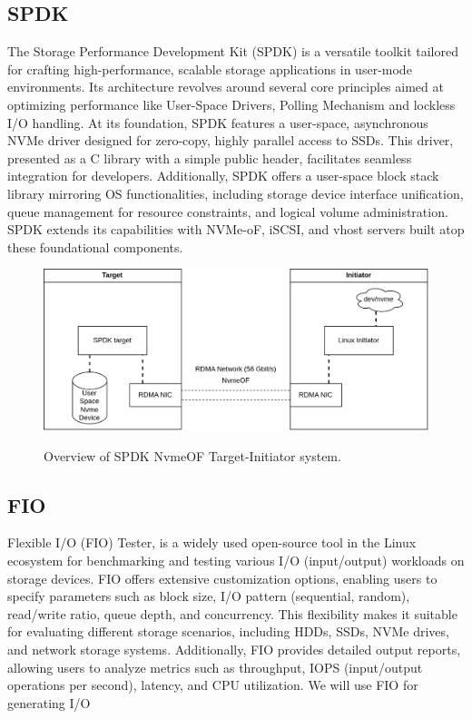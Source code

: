 \subsection{SPDK}
The Storage Performance Development Kit (SPDK) is a versatile toolkit tailored
for crafting high-performance, scalable storage applications in user-mode
environments. Its architecture revolves around several core principles aimed at
optimizing performance like User-Space Drivers, Polling Mechanism and lockless
I/O handling. At its foundation, SPDK features a user-space, asynchronous NVMe
driver designed for zero-copy, highly parallel access to SSDs. This driver,
presented as a C library with a simple public header, facilitates seamless
integration for developers. Additionally, SPDK offers a user-space block stack
library mirroring OS functionalities, including storage device interface
unification, queue management for resource constraints, and logical volume
administration. SPDK extends its capabilities with NVMe-oF, iSCSI, and vhost
servers built atop these foundational components.


\begin{figure}[h]
\includegraphics[scale=0.25]{figures/spdk-target.png}\\
\caption{Overview of SPDK NvmeOF Target-Initiator system.}
\end{figure}

\vspace{1em}
\subsection{FIO}
Flexible I/O (FIO) Tester, is a widely used open-source tool in the
Linux ecosystem for benchmarking and testing various I/O (input/output)
workloads on storage devices. FIO offers extensive customization options,
enabling users to specify parameters such as block size, I/O pattern
(sequential, random), read/write ratio, queue depth, and concurrency. This
flexibility makes it suitable for evaluating different storage scenarios,
including HDDs, SSDs, NVMe drives, and network storage systems. Additionally,
FIO provides detailed output reports, allowing users to analyze metrics such as
throughput, IOPS (input/output operations per second), latency, and CPU
utilization. We will use FIO for generating I/O 
\vspace{1em}
